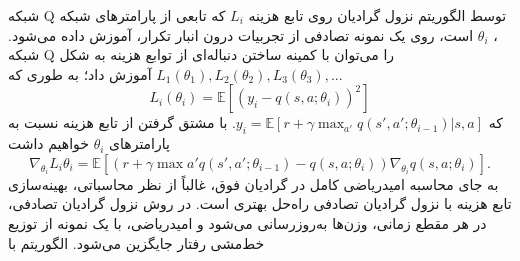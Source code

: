  شبکه Q توسط الگوریتم نزول گرادیان روی تابع هزینه 
$L_i$
که تابعی از پارامترهای شبکه 
،
$\theta_i$
 است، روی یک نمونه تصادفی از تجربیات درون انبار تکرار، آموزش داده می‌شود.
شبکه Q را می‌توان با کمینه ساختن دنباله‌ای از توابع هزینه به شکل 
$L_1(\theta_1), L_2(\theta_2), L_3(\theta_3), ... $ آموزش داد؛ به طوری که
$$L_i(\theta_i)=\mathbb{E}\left[(y_i - q(s,a;\theta_i))^2\right]$$  
که
$y_i=\mathbb{E}[r + \gamma \max_{a'} q(s',a'; \theta_{i-1})| s,a]$.
با مشتق گرفتن از تابع هزینه نسبت به پارامترهای $\theta_i$  خواهیم داشت
 $$\nabla_{\theta_i} L_i{\theta_i} = \mathbb{E}\left[ \left(r + \gamma \max{a'} q(s',a';\theta_{i-1}) - q(s,a;\theta_i)\right) \nabla_{\theta_i} q(s,a;\theta_i)\right].$$
به جای محاسبه امیدریاضی کامل در گرادیان فوق، غالباً از نظر محاسباتی، بهینه‌سازی تابع هزینه با نزول گرادیان تصادفی راه‌حل بهتری است.  در روش نزول گرادیان تصادفی، در هر مقطع زمانی، وزن‌ها به‌روزرسانی می‌شود و امیدریاضی، با یک نمونه از توزیع خط‌مشی رفتار جایگزین می‌شود.
{الگوریتم  با }

